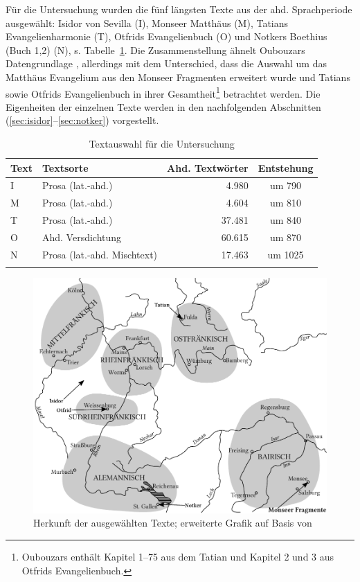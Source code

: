 Für die Untersuchung wurden die fünf längsten Texte aus der ahd. Sprachperiode ausgewählt: Isidor von Sevilla (I), Monseer Matthäus (M), Tatians Evangelienharmonie (T), Otfrids Evangelienbuch (O) und Notkers Boethius (Buch 1,2) (N), s. Tabelle~\ref{tab:ddd-auswahl}. Die Zusammenstellung ähnelt Oubouzars Datengrundlage \parencite[41--42]{Oubouzar1989}, allerdings mit dem Unterschied, dass die Auswahl um das Matthäus Evangelium aus den Monseer Fragmenten erweitert wurde und Tatians sowie Otfrids Evangelienbuch in ihrer Gesamtheit\footnote{Oubouzars  enthält Kapitel 1--75 aus dem Tatian und Kapitel 2 und 3 aus Otfrids Evangelienbuch.} betrachtet werden.  Die Eigenheiten der einzelnen Texte werden in den nachfolgenden Abschnitten (\ref{sec:isidor}--\ref{sec:notker}) vorgestellt.\largerpage[2]

\begin{table}[p]
\begin{tabular}{llrc}
\lsptoprule
Text                  & Textsorte      & Ahd. Textwörter & Entstehung \\ \midrule
I                      & Prosa (lat.-ahd.)          &   4.980                  & um 790       \\
M         & Prosa (lat.-ahd.)          & 4.604            & um 810              \\
T & Prosa (lat.-ahd.)          & 37.481                  & um 840              \\
O     & Ahd. Versdichtung          & 60.615               & um 870              \\
N   & Prosa (lat.-ahd. Mischtext) &  17.463               & um 1025             \\ \lspbottomrule
\end{tabular}
\caption{Textauswahl für die Untersuchung}
\label{tab:ddd-auswahl}
\end{table}

\begin{figure}[p]
\includegraphics[width=\textwidth]{images/koenig-atlas.pdf}
\caption {Herkunft der ausgewählten Texte; erweiterte Grafik auf Basis von  \textcite[66]{Konig2015}\label{abb:schreiborte}}
\end{figure}

